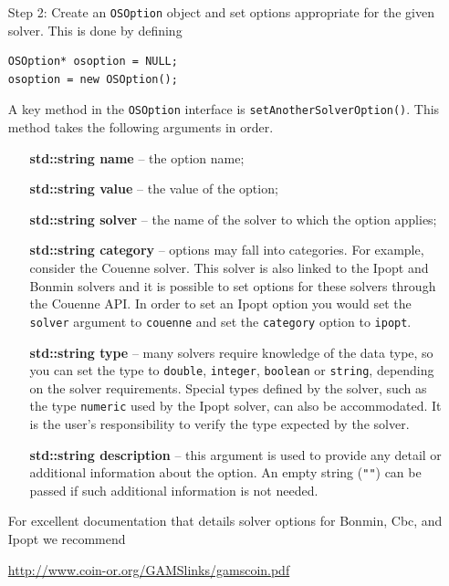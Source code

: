 \documentclass[11pt]{article}
\renewcommand{\_}{{\char"5F}}
\renewcommand{\{}{{\char"7B}}
\renewcommand{\}}{{\char"7D}}
\renewcommand{\^}{{\char"0D}}
\renewcommand{\'}{{\char"0D}}
\begin{document}
\begin{enumerate}[Step 1:]
\begin{itemize}
\item[Step 2:]  Create an {\tt OSOption} object and set options appropriate for the given solver.   
This is done by defining

\begin{verbatim}
OSOption* osoption = NULL;
osoption = new OSOption();
\end{verbatim}

A key method in the {\tt OSOption} interface is {\tt setAnotherSolverOption()}.  This method 
takes the following arguments in order.

\begin{itemize}
\item[] {\bf std::string name} -- the option name;
\item[] {\bf std::string value}  -- the value of the option;
\item[] {\bf std::string solver} -- the name of the solver to which the option applies;
\item[] {\bf std::string category} -- options may fall into categories. For example, consider the  
Couenne solver.  This solver is also linked to the Ipopt and Bonmin solvers and  it is possible 
to set options for these solvers through the Couenne API. In order to set an Ipopt option 
you would set the {\tt solver} argument to {\tt couenne} and set the {\tt category} option 
to {\tt ipopt}.

\item[] {\bf std::string type} -- many solvers require knowledge of the data type, so you can set 
the type to {\tt double}, {\tt integer}, {\tt boolean} or {\tt string}, depending on the solver 
requirements. Special types defined by the solver, such as the type {\tt numeric} used by the
Ipopt solver, can also be accommodated. It is the user's responsibility to verify the type
expected by the solver.


\item[] {\bf std::string  description} -- this argument is used to provide any detail or 
additional information about the option. An empty string ({\tt""}) can be passed if such additional
information is not needed.
\end{itemize}

For excellent documentation that details solver options for Bonmin, Cbc, and Ipopt  we recommend 

\begin{center}
\url{http://www.coin-or.org/GAMSlinks/gamscoin.pdf}
\end{center}



\end{itemize}
\end{enumerate}
\end{document}
